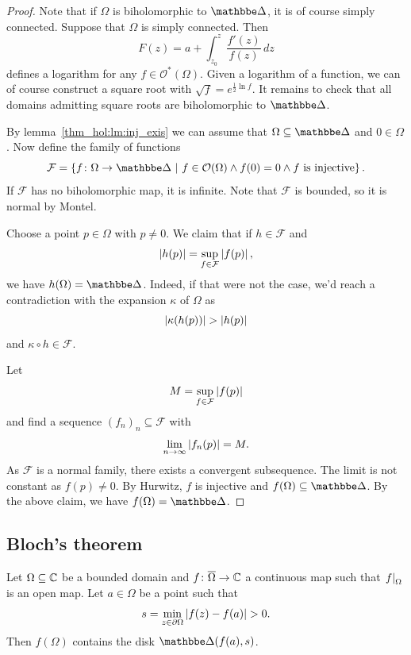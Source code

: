 \begin{proof}
Note that if $\Omega$ is biholomorphic to $\dsk$, it is of course
simply connected. Suppose that $\Omega$ is simply connected. Then
\[
F(z) = a + \int_{z_0}^z \frac{f'(z)}{f(z)}\,dz
\]
defines a logarithm for any $f \in \mathcal{O}^*(\Omega)$. Given a
logarithm of a function, we can of course construct a square root
with $\sqrt{f} = e^{\frac{1}{2} \ln f}$. It remains to check that
all domains admitting square roots are biholomorphic to $\dsk$.

By lemma~\ref{thm_hol:lm:inj_exis} we can assume that
$\Omega \subseteq \dsk$ and $0 \in \Omega$. Now define the family
of functions
\[
\mathcal{F} = \setb{f \colon \Omega \to \dsk}
{f \in \mathcal{O}(\Omega) \land
f(0) = 0 \land \text{$f$ is injective}}.
\]
If $\mathcal{F}$ has no biholomorphic map, it is infinite. Note
that $\mathcal{F}$ is bounded, so it is normal by Montel.

Choose a point $p \in \Omega$ with $p \ne 0$. We claim that if
$h \in \mathcal{F}$ and
\[
\left\lvert h(p)\right\rvert = \sup_{f \in \mathcal{F}} \left\lvert f(p)\right\rvert,
\]
we have $h(\Omega) = \dsk$. Indeed, if that were not the case, we'd
reach a contradiction with the expansion $\kappa$ of $\Omega$ as
\[
\left\lvert \kappa(h(p))\right\rvert > \left\lvert h(p)\right\rvert
\]
and $\kappa \circ h \in \mathcal{F}$.

Let
\[
M = \sup_{f \in \mathcal{F}} \left\lvert f(p)\right\rvert
\]
and find a sequence $(f_n)_n \subseteq \mathcal{F}$ with
\[
\lim_{n \to \infty} \left\lvert f_n(p)\right\rvert = M.
\]
As $\mathcal{F}$ is a normal family, there exists a convergent
subsequence. The limit is not constant as $f(p) \ne 0$. By Hurwitz,
$f$ is injective and $f(\Omega) \subseteq \dsk$. By the above
claim, we have $f(\Omega) = \dsk$.
\end{proof}

\newpage

\subsection{Bloch's theorem}


\begin{lema}
Let $\Omega \subseteq \mathbb{C}$ be a bounded domain and
$f \colon \overline{\Omega} \to \mathbb{C}$ a continuous map such that
$\left. f\right|_{\Omega}^{}$ is an open map. Let $a \in \Omega$ be a point
such that
\[
s = \min_{z \in \partial \Omega} \left\lvert f(z) - f(a)\right\rvert > 0.
\]
Then $f(\Omega)$ contains the disk $\dsk(f(a), s)$.
\end{lema}

